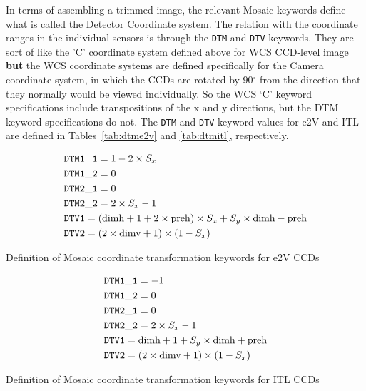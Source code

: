 \documentclass{article}[12pt]
\begin{document}
In terms of assembling a trimmed image, the relevant Mosaic keywords define what is called the Detector Coordinate system.  The relation with the coordinate ranges in the individual sensors is through the {\tt DTM} and {\tt DTV} keywords.  
They are sort of like the 'C' coordinate system defined above for WCS CCD-level image {\bf but} the WCS coordinate systems are defined specifically for the Camera coordinate system, in which the CCDs are rotated by 90$^\circ$ from the direction that they normally would be viewed individually.  So the WCS `C' keyword specifications include transpositions of the x and y directions, but the DTM keyword specifications do not.  The {\tt DTM} and {\tt DTV} keyword values for e2V and ITL are defined in Tables~\ref{tab:dtme2v} and \ref{tab:dtmitl}, respectively.

\begin{table}
\begin{align*}
& {\tt DTM1\_1} =  1 - 2 \times S_x \\
& {\tt DTM1\_2} = 0 \\
& {\tt DTM2\_1} = 0 \\
& {\tt DTM2\_2} = 2 \times S_x - 1 \\
& {\tt DTV1} = ({\rm dimh} + 1 + 2 \times {\rm preh}) \times S_x + S_y \times {\rm dimh} - {\rm preh} \\
& {\tt DTV2} = (2 \times {\rm dimv} + 1) \times (1 - S_x) \\
\end{align*}
\caption{Definition of Mosaic coordinate transformation keywords for e2V CCDs\label{tab:dtme2v}}

\end{table}

\begin{table}
\begin{align*}
& {\tt DTM1\_1} = -1 \\
& {\tt DTM1\_2} = 0 \\
& {\tt DTM2\_1} = 0 \\
& {\tt DTM2\_2} = 2 \times S_x - 1 \\
& {\tt DTV1} = {\rm dimh} + 1 + S_y \times {\rm dimh} + {\rm preh}  \\
& {\tt DTV2} = (2 \times {\rm dimv} + 1) \times (1 - S_x) \\
\end{align*}
\caption{Definition of Mosaic coordinate transformation keywords for ITL CCDs\label{tab:dtmitl}}
\end{table}
\end{document}
